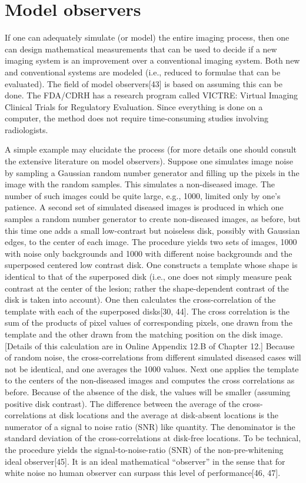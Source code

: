 \documentclass[
]{book}
\begin{document}
\hypertarget{model-observers}{%
\section{Model observers}\label{model-observers}}

If one can adequately simulate (or model) the entire imaging process, then one can design mathematical measurements that can be used to decide if a new imaging system is an improvement over a conventional imaging system. Both new and conventional systems are modeled (i.e., reduced to formulae that can be evaluated). The field of model observers{[}43{]} is based on assuming this can be done. The FDA/CDRH has a research program called VICTRE: Virtual Imaging Clinical Trials for Regulatory Evaluation. Since everything is done on a computer, the method does not require time-consuming studies involving radiologists.

A simple example may elucidate the process (for more details one should consult the extensive literature on model observers). Suppose one simulates image noise by sampling a Gaussian random number generator and filling up the pixels in the image with the random samples. This simulates a non-diseased image. The number of such images could be quite large, e.g., 1000, limited only by one's patience. A second set of simulated diseased images is produced in which one samples a random number generator to create non-diseased images, as before, but this time one adds a small low-contrast but noiseless disk, possibly with Gaussian edges, to the center of each image. The procedure yields two sets of images, 1000 with noise only backgrounds and 1000 with different noise backgrounds and the superposed centered low contrast disk. One constructs a template whose shape is identical to that of the superposed disk (i.e., one does not simply measure peak contrast at the center of the lesion; rather the shape-dependent contrast of the disk is taken into account). One then calculates the cross-correlation of the template with each of the superposed disks{[}30, 44{]}. The cross correlation is the sum of the products of pixel values of corresponding pixels, one drawn from the template and the other drawn from the matching position on the disk image. {[}Details of this calculation are in Online Appendix 12.B of Chapter 12.{]} Because of random noise, the cross-correlations from different simulated diseased cases will not be identical, and one averages the 1000 values. Next one applies the template to the centers of the non-diseased images and computes the cross correlations as before. Because of the absence of the disk, the values will be smaller (assuming positive disk contrast). The difference between the average of the cross-correlations at disk locations and the average at disk-absent locations is the numerator of a signal to noise ratio (SNR) like quantity. The denominator is the standard deviation of the cross-correlations at disk-free locations. To be technical, the procedure yields the signal-to-noise-ratio (SNR) of the non-pre-whitening ideal observer{[}45{]}. It is an ideal mathematical ``observer'' in the sense that for white noise no human observer can surpass this level of performance{[}46, 47{]}.
\end{document}

